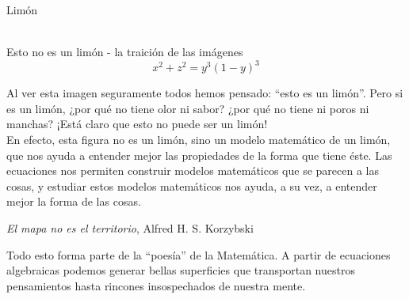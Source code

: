 \documentclass[es]{../../common/SurferDesc}%
\begin{document}
\footnotesize

\begin{surferPage}
  \begin{surferTitle}Lim\'on\end{surferTitle}  \\ %
Esto no es un lim\'on - la traici\'on de las im\'agenes\\
\smallskip
\[x^2 + z^2 = y^3 (1 - y)^3\] 

\vspace{0.3cm}
Al ver esta imagen seguramente todos hemos pensado: “esto es un lim\'on”. Pero si es un lim\'on, ¿por qu\'e no tiene olor ni sabor? ¿por qu\'e no tiene ni poros ni manchas? ¡Est\'a claro que esto no puede ser un lim\'on!\\
\vspace{0.3cm}
En efecto, esta figura no es un lim\'on, sino un modelo matem\'atico de un lim\'on, que nos ayuda a entender mejor las propiedades de la forma que tiene \'este. Las ecuaciones nos permiten construir modelos matem\'aticos que se parecen a las cosas, y estudiar estos modelos matem\'aticos nos ayuda, a su vez, a entender mejor la forma de las cosas.
\vspace{0.3cm}
\begin{center}
\emph{El mapa no es el territorio}, Alfred H. S. Korzybski
\end{center}
\vspace{0.3cm}
Todo esto forma parte de la “poes\'ia” de la Matem\'atica. A partir de ecuaciones algebraicas podemos generar bellas superficies que transportan nuestros pensamientos hasta rincones insospechados de nuestra mente.

  \begin{surferText}
     \end{surferText}
\end{surferPage}
\end{document}
